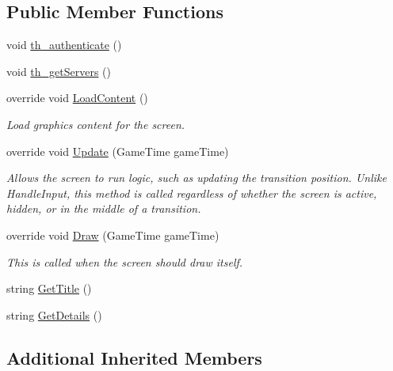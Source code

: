 \subsection*{Public Member Functions}
\begin{DoxyCompactItemize}
\item 
void \hyperlink{classgearit_1_1src_1_1gui_1_1_menu_play_a28597c13b8d65ca1c8ca39fb51b44cec}{th\+\_\+authenticate} ()
\item 
void \hyperlink{classgearit_1_1src_1_1gui_1_1_menu_play_ab941e76740981fb4c6da8fe7bb173134}{th\+\_\+get\+Servers} ()
\item 
override void \hyperlink{classgearit_1_1src_1_1gui_1_1_menu_play_af910914479191ff3c5df9a9371a508dd}{Load\+Content} ()
\begin{DoxyCompactList}\small\item\em Load graphics content for the screen. \end{DoxyCompactList}\item 
override void \hyperlink{classgearit_1_1src_1_1gui_1_1_menu_play_a81c6b64878420e9905deec6038b1804f}{Update} (Game\+Time game\+Time)
\begin{DoxyCompactList}\small\item\em Allows the screen to run logic, such as updating the transition position. Unlike Handle\+Input, this method is called regardless of whether the screen is active, hidden, or in the middle of a transition. \end{DoxyCompactList}\item 
override void \hyperlink{classgearit_1_1src_1_1gui_1_1_menu_play_a5d930bebee9e40d7a74a6427bb028fc5}{Draw} (Game\+Time game\+Time)
\begin{DoxyCompactList}\small\item\em This is called when the screen should draw itself. \end{DoxyCompactList}\item 
string \hyperlink{classgearit_1_1src_1_1gui_1_1_menu_play_a02ce51245e638777e7736d474eead42b}{Get\+Title} ()
\item 
string \hyperlink{classgearit_1_1src_1_1gui_1_1_menu_play_ad1134c4aec4b65780d1b053b2a39e337}{Get\+Details} ()
\end{DoxyCompactItemize}
\subsection*{Additional Inherited Members}



